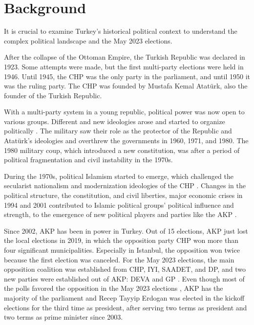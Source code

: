 \section{Background}

It is crucial to examine Turkey's historical political context to understand 
the complex political landscape and the May 2023 elections.

After the collapse of the Ottoman Empire, the Turkish Republic was declared in 1923.
Some attempts were made, but the first multi-party elections were held in 1946. 
Until 1945, the \ac{CHP} was the only party in the parliament, and until 1950 it was the ruling party.
The \ac{CHP} was founded by Mustafa Kemal Atatürk, also the founder of the Turkish Republic.

With a multi-party system in a young republic, political power was now open to various groups.
Different and new ideologies arose and started to organize politically \parencite{rise_of_islam_turkey}.
The military saw their role as the protector of the Republic and Atatürk's ideologies 
and overthrew the governments in 1960, 1971, and 1980.
The 1980 military coup, which introduced a new constitution, was after a period of
political fragmentation and civil instability in the 1970s. 

During the 1970s, political Islamism started to emerge, which challenged 
the secularist nationalism and modernization ideologies of the \ac{CHP} \parencite{erdoganism_akp_after_15_years}. 
Changes in the political structure, the constitution, and civil liberties, major economic crises in 1994 and 2001 \parencite{financial_crisis_turkey_1994}
contributed to Islamic political groups' political influence and strength, 
to the emergence of new political players and parties like the \ac{AKP} \parencite{rise_of_islam_turkey}.

Since 2002, \ac{AKP} has been in power in Turkey. Out of 15 elections, \ac{AKP} just lost the 
local elections in 2019, in which the opposition party \ac{CHP} won more than four significant municipalities. 
Especially in Istanbul, the opposition won twice because the first election was canceled. 
For the May 2023 elections, the main opposition coalition was established from \ac{CHP}, \ac{IYI}, \ac{SAADET}, 
and \ac{DP}, and two new parties were established out of \ac{AKP}: \ac{DEVA} and \ac{GP} 
\parencite{Atila_medyascope_tr_secim_tarihi_2022}. 
Even though most of the polls favored the opposition in the May 2023 elections 
\parencite{Saç_Çoban_teyit_anketler_2023}, \ac{AKP} has the majority of the parliament and 
Recep Tayyip Erdogan was elected in the kickoff elections for the third time as president, after serving two terms as president and two terms as prime minister since 2003.

